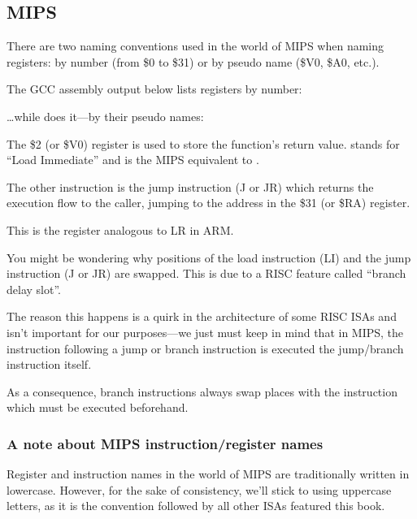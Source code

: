 \subsection{MIPS}

\label{MIPS_leaf_function_ex1}
There are two naming conventions used in the world of MIPS when naming registers: by number (from \$0 to \$31) or by pseudo name (\$V0, \$A0, etc.).

The GCC assembly output below lists registers by number:



\dots while \IDA does it---by their pseudo names:



The \$2 (or \$V0) register is used to store the function's return value.
 stands for ``Load Immediate'' and is the MIPS equivalent to \MOV.

The other instruction is the jump instruction (J or JR) which returns the execution flow to the \gls{caller}, jumping to the address in the \$31 (or \$RA) register.

This is the register analogous to \ac{LR} in ARM.

You might be wondering why positions of the load instruction (LI) and the jump instruction (J or JR) are swapped. This is due to a \ac{RISC} feature called ``branch delay slot''.

The reason this happens is a quirk in the architecture of some RISC \ac{ISA}s and isn't important for our purposes---we just must keep in mind that in MIPS, the instruction following a jump or branch instruction
is executed  the jump/branch instruction itself.

As a consequence, branch instructions always swap places with the instruction which must be executed beforehand.

\subsubsection{A note about MIPS instruction/register names}

Register and instruction names in the world of MIPS are traditionally written in lowercase.
However, for the sake of consistency, we'll stick to using uppercase letters,
as it is the convention followed by all other \ac{ISA}s featured this book.


